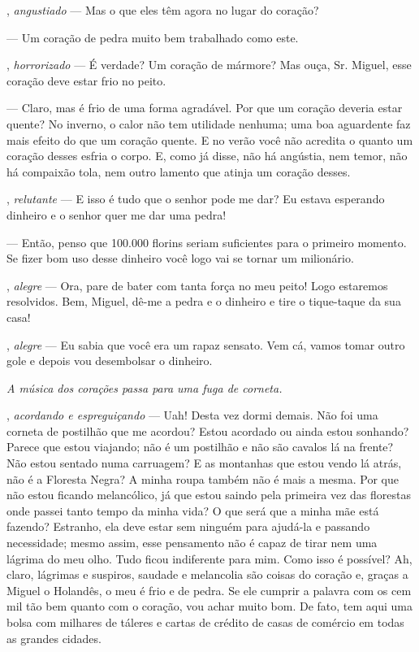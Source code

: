 \begin{myparindent}{0pt}
\begin{Parskip}
, \emph{angustiado} --- Mas o que eles têm agora no
lugar do coração?

 --- Um coração de pedra muito bem trabalhado como este.

, \emph{horrorizado} --- É verdade? Um coração de
mármore? Mas ouça, Sr. Miguel, esse coração deve estar frio no peito.

 --- Claro, mas é frio de uma forma agradável. Por que
um coração deveria estar quente? No inverno, o calor não tem utilidade
nenhuma; uma boa aguardente faz mais efeito do que um coração quente. E
no verão você não acredita o quanto um coração desses esfria o corpo. E,
como já disse, não há angústia, nem temor, não há compaixão tola, nem
outro lamento que atinja um coração desses.

, \emph{relutante} --- E isso é tudo que o senhor
pode me dar? Eu estava esperando dinheiro e o senhor quer me dar uma
pedra!

 --- Então, penso que 100.000 florins seriam suficientes
para o primeiro momento. Se fizer bom uso desse dinheiro você logo vai
se tornar um milionário.

, \emph{alegre} --- Ora, pare de bater com tanta
força no meu peito! Logo estaremos resolvidos. Bem, Miguel, dê-me a
pedra e o dinheiro e tire o tique-taque da sua casa!

, \emph{alegre} --- Eu sabia que você era um rapaz
sensato. Vem cá, vamos tomar outro gole e depois vou desembolsar o
dinheiro.

\emph{A música dos corações passa para uma fuga de corneta.}

, \emph{acordando e espreguiçando} --- Uah! Desta vez
dormi demais. Não foi uma corneta de postilhão que me acordou? Estou
acordado ou ainda estou sonhando? Parece que estou viajando; não é um
postilhão e não são cavalos lá na frente? Não estou sentado numa
carruagem? E as montanhas que estou vendo lá atrás, não é a Floresta
Negra? A minha roupa também não é mais a mesma. Por que não estou
ficando melancólico, já que estou saindo pela primeira vez das florestas
onde passei tanto tempo da minha vida? O que será que a minha mãe está
fazendo? Estranho, ela deve estar sem ninguém para ajudá-la e passando
necessidade; mesmo assim, esse pensamento não é capaz de tirar nem uma
lágrima do meu olho. Tudo ficou indiferente para mim. Como isso é
possível? Ah, claro, lágrimas e suspiros, saudade e melancolia são
coisas do coração e, graças a Miguel o Holandês, o meu é frio e de
pedra. Se ele cumprir a palavra com os cem mil tão bem quanto com o
coração, vou achar muito bom. De fato, tem aqui uma bolsa com milhares
de táleres e cartas de crédito de casas de comércio em todas as grandes
cidades.


\end{Parskip}
\end{myparindent}
